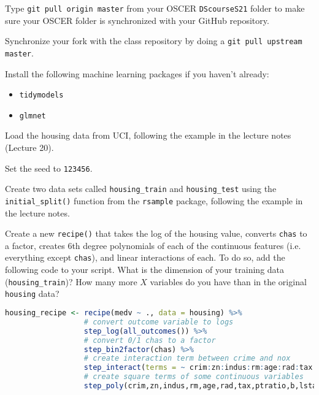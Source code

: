 \documentclass[12pt,english]{exam}
\begin{document}
\begin{questions}
\question Type \texttt{git pull origin master} from your OSCER \texttt{DScourseS21} folder to make sure your OSCER folder is synchronized with your GitHub repository. 

\question Synchronize your fork with the class repository by doing a \texttt{git pull upstream master}.

\question Install the following machine learning packages if you haven't already:
\begin{itemize}
    \item \texttt{tidymodels}
    \item \texttt{glmnet}
\end{itemize}

\question Load the housing data from UCI, following the example in the lecture notes (Lecture 20).

\question Set the seed to \texttt{123456}.

\question Create two data sets called \texttt{housing\_train} and \texttt{housing\_test} using the \texttt{initial\_split()} function from the \texttt{rsample} package, following the example in the lecture notes.

\question Create a new \texttt{recipe()} that takes the log of the housing value, converts \texttt{chas} to a factor, creates 6th degree polynomials of each of the continuous features (i.e. everything except \texttt{chas}), and linear interactions of each. To do so, add the following code to your script. What is the dimension of your training data (\texttt{housing\_train})? How many more $X$ variables do you have than in the original \texttt{housing} data?
\begin{lstlisting}[language=R]
housing_recipe <- recipe(medv ~ ., data = housing) %>%
                  # convert outcome variable to logs
                  step_log(all_outcomes()) %>%
                  # convert 0/1 chas to a factor
                  step_bin2factor(chas) %>%
                  # create interaction term between crime and nox
                  step_interact(terms = ~ crim:zn:indus:rm:age:rad:tax:ptratio:b:lstat:dis:nox) %>%
                  # create square terms of some continuous variables
                  step_poly(crim,zn,indus,rm,age,rad,tax,ptratio,b,lstat,dis,nox, degree=6)


\end{lstlisting}
\end{questions}
\end{document}
